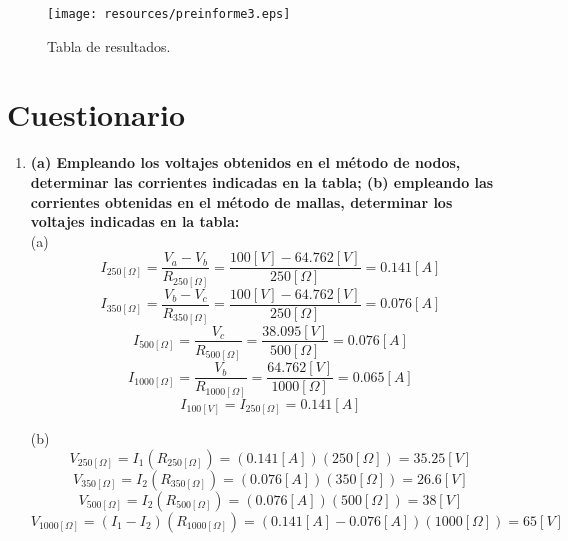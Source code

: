 \documentclass[letter,11pt]{article}
\begin{document}
\begin{figure}[!h]
\centering
\texttt{[image: resources/preinforme3.eps]}
\caption{Tabla de resultados.}
\label{tablas}
\end{figure}

\newpage

\section{Cuestionario}

\begin{enumerate}

\item \textbf{(a) Empleando los voltajes obtenidos en el método de nodos,
determinar las corrientes indicadas en la tabla; (b) empleando las corrientes
obtenidas en el método de mallas, determinar los voltajes indicadas en la
tabla:} \\

(a)
\begin{equation*}
    I_{250[\Omega]}
        = \frac{V_a-V_b}{R_{250[\Omega]}}
        = \frac{100[V]-64.762[V]}{250[\Omega]}
        = 0.141[A]
\end{equation*}
\begin{equation*}
    I_{350[\Omega]}
        = \frac{V_b-V_c}{R_{350[\Omega]}}
        = \frac{100[V]-64.762[V]}{250[\Omega]}
        = 0.076[A]
\end{equation*}
\begin{equation*}
    I_{500[\Omega]}
        = \frac{V_c}{R_{500[\Omega]}}
        = \frac{38.095[V]}{500[\Omega]}
        = 0.076[A]
\end{equation*}
\begin{equation*}
    I_{1000[\Omega]}
        = \frac{V_b}{R_{1000[\Omega]}}
        = \frac{64.762[V]}{1000[\Omega]}
        = 0.065[A]
\end{equation*}
\begin{equation*}
    I_{100[V]} = I_{250[\Omega]} = 0.141[A]
\end{equation*}

(b)
\begin{equation*}
    V_{250[\Omega]}
        = I_1(R_{250[\Omega]})
        = (0.141[A])(250[\Omega])
        = 35.25[V]
\end{equation*}
\begin{equation*}
    V_{350[\Omega]}
        = I_2(R_{350[\Omega]})
        = (0.076[A])(350[\Omega])
        = 26.6[V]
\end{equation*}
\begin{equation*}
    V_{500[\Omega]}
        = I_2(R_{500[\Omega]})
        = (0.076[A])(500[\Omega])
        = 38[V]
\end{equation*}
\begin{equation*}
    V_{1000[\Omega]}
        = (I_1-I_2)(R_{1000[\Omega]})
        = (0.141[A]-0.076[A])(1000[\Omega])
        = 65[V]
\end{equation*}


\end{enumerate}
\end{document}
